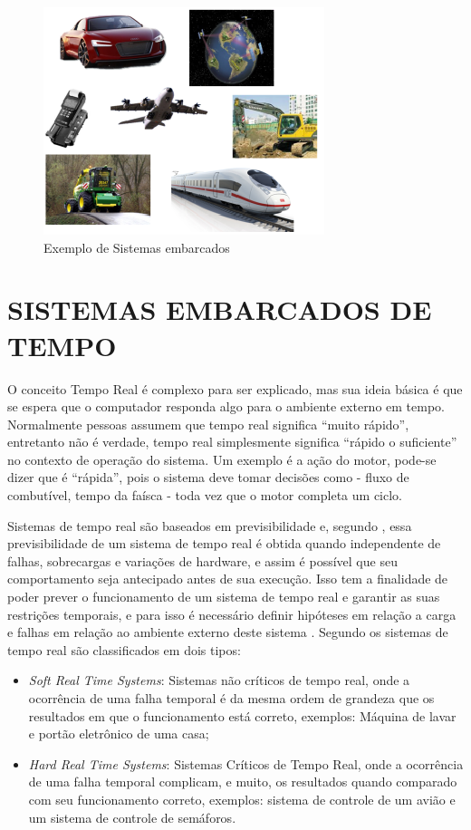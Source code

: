 \begin{figure}[htp]
	\centering
	\includegraphics[scale=1]{images/exemplo_sistemas_embarcados.png}
	\caption{Exemplo de Sistemas embarcados}	
	\label{fig:exemplosistemasembarcados}	
\end{figure}

\section{SISTEMAS EMBARCADOS DE TEMPO}
O conceito Tempo Real é complexo para ser explicado, mas sua ideia básica é que se espera que o computador responda algo para o ambiente externo em tempo. Normalmente pessoas assumem que tempo real significa “muito rápido”, entretanto não é verdade, tempo real simplesmente significa “rápido o suficiente” no contexto de operação do sistema. Um exemplo é a ação do motor, pode-se dizer que é “rápida”, pois o sistema deve tomar decisões como - fluxo de combutível, tempo da faísca - toda vez que o motor completa um ciclo.

Sistemas de tempo real são baseados em previsibilidade e, segundo \cite{farines2000sistemas}, essa previsibilidade de um sistema de tempo real é obtida quando independente de falhas, sobrecargas e variações de hardware, e assim é possível que seu comportamento seja antecipado antes de sua execução. Isso tem a finalidade de poder prever o funcionamento de um sistema de tempo real e garantir as suas restrições temporais, e para isso é necessário definir hipóteses em relação a carga e falhas em relação ao ambiente externo deste sistema \cite{farines2000sistemas}. 
Segundo \cite{mall2009real} os sistemas de tempo real são classificados em dois tipos:
\begin{itemize}
\item \emph{Soft Real Time Systems}: Sistemas não críticos de tempo real, onde a ocorrência de uma falha temporal é da mesma ordem de grandeza que os resultados em que o funcionamento está correto, exemplos: Máquina de lavar e portão eletrônico de uma casa;
\item \emph{Hard Real Time Systems}: Sistemas Críticos de Tempo Real, onde a ocorrência de uma falha temporal complicam, e muito, os resultados quando comparado com seu funcionamento correto, exemplos: sistema de controle de um avião e um sistema de controle de semáforos.
\end{itemize}


